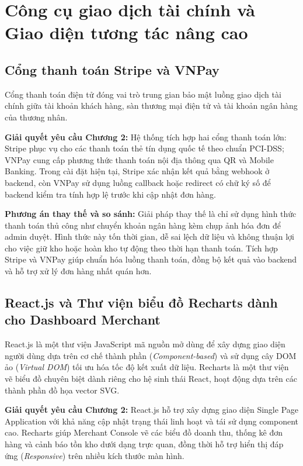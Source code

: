 \documentclass[../DoAn.tex]{subfiles}
\begin{document}
\section{Công cụ giao dịch tài chính và Giao diện tương tác nâng cao}
\label{section:3.5}

\subsection{Cổng thanh toán Stripe và VNPay}
Cổng thanh toán điện tử đóng vai trò trung gian bảo mật luồng giao dịch tài chính giữa tài khoản khách hàng, sàn thương mại điện tử và tài khoản ngân hàng của thương nhân.

\textbf{Giải quyết yêu cầu Chương 2:}
Hệ thống tích hợp hai cổng thanh toán lớn: Stripe phục vụ cho các thanh toán thẻ tín dụng quốc tế theo chuẩn PCI-DSS; VNPay cung cấp phương thức thanh toán nội địa thông qua QR và Mobile Banking. Trong cài đặt hiện tại, Stripe xác nhận kết quả bằng webhook ở backend, còn VNPay sử dụng luồng callback hoặc redirect có chữ ký số để backend kiểm tra tính hợp lệ trước khi cập nhật đơn hàng.

\textbf{Phương án thay thế và so sánh:}
Giải pháp thay thế là chỉ sử dụng hình thức thanh toán thủ công như chuyển khoản ngân hàng kèm chụp ảnh hóa đơn để admin duyệt. Hình thức này tốn thời gian, dễ sai lệch dữ liệu và không thuận lợi cho việc giữ kho hoặc hoàn kho tự động theo thời hạn thanh toán. Tích hợp Stripe và VNPay giúp chuẩn hóa luồng thanh toán, đồng bộ kết quả vào backend và hỗ trợ xử lý đơn hàng nhất quán hơn.

\subsection{React.js và Thư viện biểu đồ Recharts dành cho Dashboard Merchant}
React.js là một thư viện JavaScript mã nguồn mở dùng để xây dựng giao diện người dùng dựa trên cơ chế thành phần (\textit{Component-based}) và sử dụng cây DOM ảo (\textit{Virtual DOM}) tối ưu hóa tốc độ kết xuất dữ liệu. Recharts là một thư viện vẽ biểu đồ chuyên biệt dành riêng cho hệ sinh thái React, hoạt động dựa trên các thành phần đồ họa vector SVG.

\textbf{Giải quyết yêu cầu Chương 2:}
React.js hỗ trợ xây dựng giao diện Single Page Application với khả năng cập nhật trạng thái linh hoạt và tái sử dụng component cao. Recharts giúp Merchant Console vẽ các biểu đồ doanh thu, thống kê đơn hàng và cảnh báo tồn kho dưới dạng trực quan, đồng thời hỗ trợ hiển thị đáp ứng (\textit{Responsive}) trên nhiều kích thước màn hình.
\end{document}
